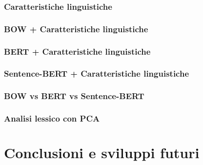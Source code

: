 \documentclass[oneside]{book}
\begin{document}
\subsection{Caratteristiche linguistiche}
\subsection{BOW + Caratteristiche linguistiche}
\subsection{BERT + Caratteristiche linguistiche}
\subsection{Sentence-BERT + Caratteristiche linguistiche}
\subsection{BOW vs BERT vs Sentence-BERT}
\subsection{Analisi lessico con PCA}


\chapter{Conclusioni e sviluppi futuri}
\end{document}
